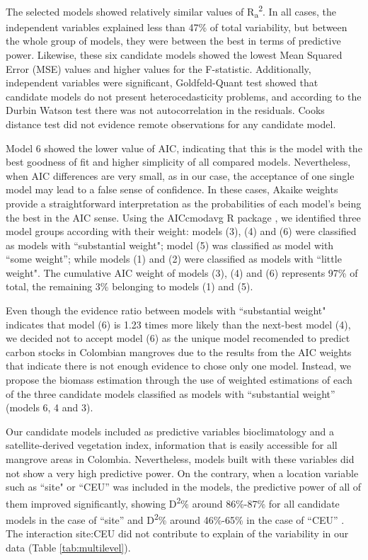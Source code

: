 \documentclass[review, authoryear]{elsarticle}   	%
\begin{document}
The selected models showed relatively similar values of R\textsubscript{a}\textsuperscript{2}. In all cases, the independent variables explained less than 47\% of total variability, but between the whole group of models,  they were between the best in terms of predictive power. Likewise, these six candidate models showed the lowest Mean Squared Error (MSE) values and higher values for the F-statistic. Additionally, independent variables were significant, Goldfeld-Quant test showed that candidate models do not present heterocedasticity problems, and according to the Durbin Watson test there was not autocorrelation in the residuals. Cooks distance test did not evidence remote observations for any candidate model. 

Model 6 showed the lower value of AIC, indicating that this is the model with the best goodness of fit and higher simplicity of all compared models. Nevertheless, when AIC differences are very small, as in our case, the acceptance of one single model may lead to a false sense of confidence. In these cases, Akaike weights provide a straightforward interpretation as the probabilities of each model's being the best in the AIC sense. Using the AICcmodavg R package \citep{Mazerolle:2015aa}, we identified three model groups according with their weight: models (3), (4) and (6) were classified as models with ``substantial weight"; model (5) was classified as model with ``some weight''; while models (1) and (2) were classified  as models with ``little weight". The cumulative AIC weight of models (3), (4) and (6) represents 97\% of total, the remaining 3\% belonging to models (1) and (5). 

Even though the evidence ratio between models with ``substantial weight" indicates that model (6) is 1.23 times more likely than  the next-best model (4), we decided not to accept model (6) as the unique model recomended to predict carbon stocks in Colombian mangroves due to  the results from the AIC weights that indicate there is not enough evidence to chose only one model. Instead, we propose the biomass estimation through the use of weighted estimations of each of the three candidate models classified as models with ``substantial weight'' (models 6, 4 and 3).

Our candidate models included as predictive variables bioclimatology and a satellite-derived vegetation index, information that is easily accessible for all mangrove areas in Colombia. Nevertheless, models built with these variables did not show a very high predictive power. On the contrary, when a location variable such as ``site" or ``CEU'' was included in the models, the predictive power of all of them improved significantly, showing D\textsuperscript{2}\% around 86\%-87\% for all candidate models in the case of ``site'' and D\textsuperscript{2}\% around 46\%-65\%  in the case of ``CEU'' . The interaction site:CEU  did not contribute to explain of the variability in our data (Table \ref{tab:multilevel}).
\end{document}
